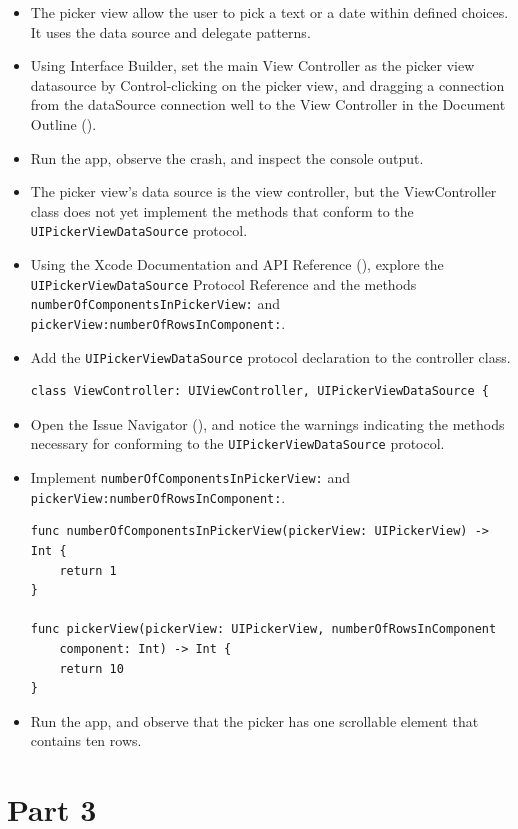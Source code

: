 \documentclass[a4paper,11pt]{scrartcl}
\begin{document}
\begin{itemize}
\item The picker view allow the user to pick a text or a date within defined choices. It uses the data source and delegate patterns.
\item Using Interface Builder, set the main View Controller as the picker view datasource by Control-clicking on the picker view, and dragging a connection from the dataSource connection well to the View Controller in the Document Outline ().
\item Run the app, observe the crash, and inspect the console output.
\item The picker view's data source is the view controller, but the ViewController class does not yet implement the methods that conform to the \texttt{UIPickerViewDataSource} protocol.
\item Using the Xcode Documentation and API Reference (), explore the \\\texttt{UIPickerViewDataSource} Protocol Reference and the methods \texttt{numberOfComponentsInPickerView:} and \texttt{pickerView:numberOfRowsInComponent:}.
\item Add the \texttt{UIPickerViewDataSource} protocol declaration to the controller class.
\begin{lstlisting}
class ViewController: UIViewController, UIPickerViewDataSource {
\end{lstlisting}
\item Open the Issue Navigator (), and notice the warnings indicating the methods necessary for conforming to the \texttt{UIPickerViewDataSource} protocol.
\item Implement \texttt{numberOfComponentsInPickerView:} and \texttt{pickerView:numberOfRowsInComponent:}.
\begin{lstlisting}
func numberOfComponentsInPickerView(pickerView: UIPickerView) -> Int {
	return 1
}

func pickerView(pickerView: UIPickerView, numberOfRowsInComponent
	component: Int) -> Int {
	return 10
}
\end{lstlisting}
\item Run the app, and observe that the picker has one scrollable element that contains ten rows.
\end{itemize}

\section*{Part 3}
\end{document}
